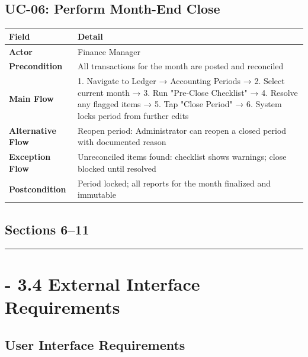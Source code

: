 \documentclass[journal, a4paper, onecolumn, 12pt]{IEEEtran}
\begin{document}
\subsection{UC-06: Perform Month-End Close}

\begin{longtable}{|p{}|p{}|}
\hline
Field & Detail \\ \hline
\hline
\textbf{Actor} & Finance Manager \\ \hline
\textbf{Precondition} & All transactions for the month are posted and reconciled \\ \hline
\textbf{Main Flow} & 1. Navigate to Ledger → Accounting Periods → 2. Select current month → 3. Run "Pre-Close Checklist" → 4. Resolve any flagged items → 5. Tap "Close Period" → 6. System locks period from further edits \\ \hline
\textbf{Alternative Flow} & Reopen period: Administrator can reopen a closed period with documented reason \\ \hline
\textbf{Exception Flow} & Unreconciled items found: checklist shows warnings; close blocked until resolved \\ \hline
\textbf{Postcondition} & Period locked; all reports for the month finalized and immutable \\ \hline
\end{longtable}
\subsection{Sections 6–11}

\vspace{1em}\hrule\vspace{1em}

\section{    - 3.4 External Interface Requirements}

\subsection{User Interface Requirements}
\end{document}
